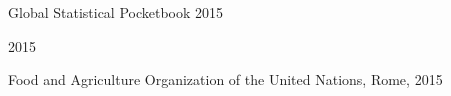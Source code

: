 \onecolumn
{}

\vspace*{100pt}
\begin{center}
\Huge{Global Statistical Pocketbook 2015}
\end{center}

\vspace*{10pt}
\begin{center}
\Huge{2015}
\end{center}

\vfill
\begin{center}
Food and Agriculture Organization of the United Nations, Rome, 2015
\end{center}

\newpage